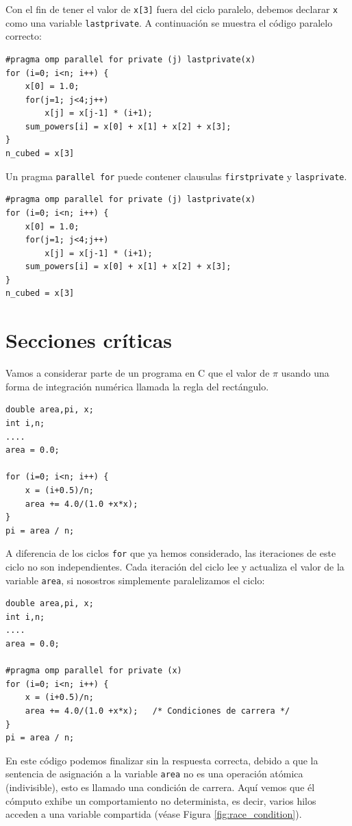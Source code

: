 \documentclass[12pt,letterpaper]{book}
\begin{document}
Con el fin de tener el valor de \texttt{x[3]} fuera del ciclo paralelo, debemos declarar \texttt{x} como una variable \texttt{lastprivate}. A continuación se muestra el código paralelo correcto:

\begin{lstlisting}[style=C]
#pragma omp parallel for private (j) lastprivate(x)
for (i=0; i<n; i++) {
	x[0] = 1.0;
	for(j=1; j<4;j++) 
		x[j] = x[j-1] * (i+1);
	sum_powers[i] = x[0] + x[1] + x[2] + x[3];
}
n_cubed = x[3]
\end{lstlisting}

Un pragma \texttt{parallel for} puede contener clausulas \texttt{firstprivate} y \texttt{lasprivate}. 

\begin{lstlisting}[style=C]
#pragma omp parallel for private (j) lastprivate(x)
for (i=0; i<n; i++) {
	x[0] = 1.0;
	for(j=1; j<4;j++) 
		x[j] = x[j-1] * (i+1);
	sum_powers[i] = x[0] + x[1] + x[2] + x[3];
}
n_cubed = x[3]
\end{lstlisting}


\section{Secciones críticas}
Vamos a considerar parte de un programa en C que el valor de $\pi$ usando una forma de integración numérica llamada la regla del rectángulo.

\begin{lstlisting}[style=C]
double area,pi, x;
int i,n;
....
area = 0.0;

for (i=0; i<n; i++) {
	x = (i+0.5)/n;
	area += 4.0/(1.0 +x*x);
}
pi = area / n;
\end{lstlisting}

A diferencia de los ciclos \texttt{for} que ya hemos considerado, las iteraciones de este ciclo no son independientes. Cada iteración del ciclo lee y actualiza el valor de la variable \texttt{area}, si nosostros simplemente paralelizamos el ciclo:

\begin{lstlisting}[style=C]
double area,pi, x;
int i,n;
....
area = 0.0;

#pragma omp parallel for private (x) 
for (i=0; i<n; i++) {
	x = (i+0.5)/n;
	area += 4.0/(1.0 +x*x);   /* Condiciones de carrera */
}
pi = area / n;
\end{lstlisting}

En este código podemos finalizar sin la respuesta correcta, debido a que la sentencia de asignación a la variable \texttt{area} no es una operación atómica (indivisible), esto es llamado una condición de carrera.  Aquí vemos que él cómputo exhibe un comportamiento no determinista, es decir,  varios hilos acceden a una variable compartida (véase Figura \ref{fig:race_condition}).
\end{document}
